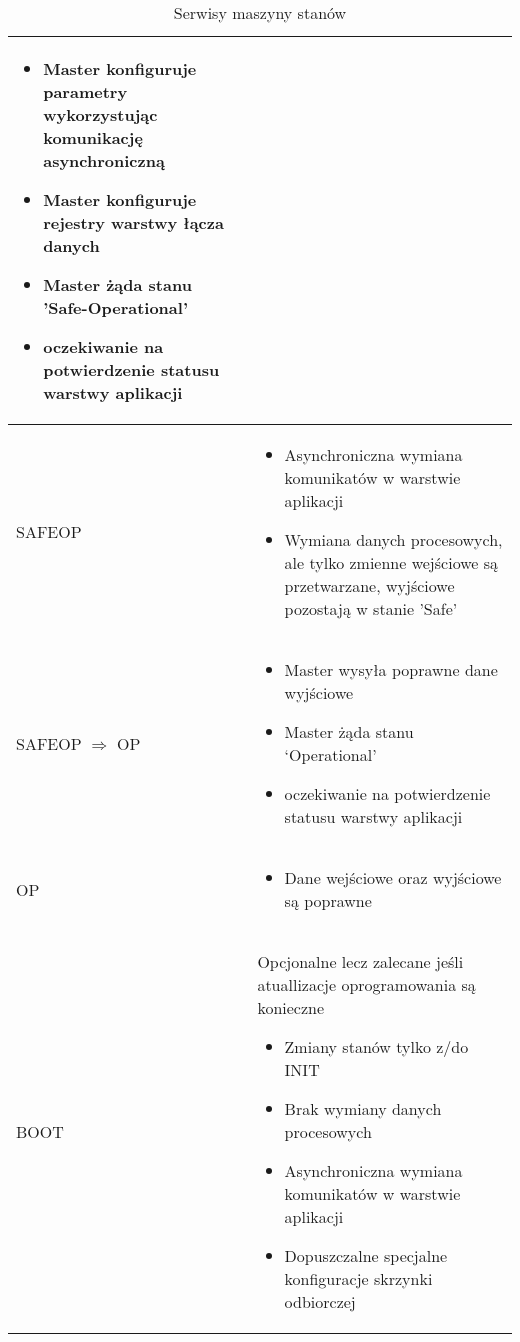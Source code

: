 \begin{table}[!htb]
\begin{center}
\begin{tabular}{| p{} | p{} |}
\begin{itemize}
\item Master konfiguruje parametry wykorzystując komunikację asynchroniczną
\item Master konfiguruje rejestry warstwy łącza danych
\item Master żąda stanu 'Safe-Operational'
\item oczekiwanie na potwierdzenie statusu warstwy aplikacji
\end{itemize}\\\hline
SAFEOP & \begin{itemize}
\item Asynchroniczna wymiana komunikatów w warstwie aplikacji
\item Wymiana danych procesowych, ale tylko zmienne wejściowe są przetwarzane, wyjściowe pozostają w stanie 'Safe'
\end{itemize}\\\hline
SAFEOP $\Rightarrow$ OP & \begin{itemize} \setlength{\itemsep}{0pt} \setlength{\parskip}{0pt} \setlength{\parsep}{0pt} \setlength{\topsep}{0pt}
\item Master wysyła poprawne dane wyjściowe
\item Master żąda stanu ‘Operational’
\item oczekiwanie na potwierdzenie statusu warstwy aplikacji
\end{itemize}\\\hline
OP & \begin{itemize} \setlength{\itemsep}{0pt} \setlength{\parskip}{0pt} \setlength{\parsep}{0pt} \setlength{\topsep}{0pt}
\item Dane wejściowe oraz wyjściowe są poprawne
\end{itemize}\\\hline
BOOT & Opcjonalne lecz zalecane jeśli atuallizacje oprogramowania są konieczne\begin{itemize} \setlength{\itemsep}{0pt} \setlength{\parskip}{0pt} \setlength{\parsep}{0pt} \setlength{\topsep}{0pt}
\item Zmiany stanów tylko z/do INIT
\item Brak wymiany danych procesowych
\item Asynchroniczna wymiana komunikatów w warstwie aplikacji
\item Dopuszczalne specjalne konfiguracje skrzynki odbiorczej
\end{itemize}\\\hline
\end{tabular}
\end{center}
\vspace*{-6mm}
  \caption{Serwisy maszyny stanów}
	\label{etherCAT:state_machine_services}
\end{table}